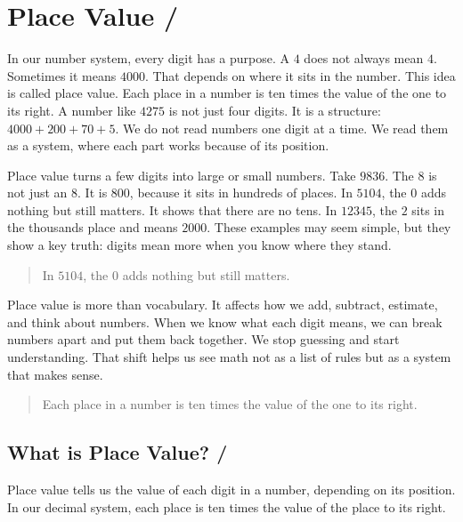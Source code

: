 
\section{Place Value / }

In our number system, every digit has a purpose. A \(4\) does not always mean \(4\).
Sometimes it means \(4000\). That depends on where it sits in the number. This idea
is called place value. Each place in a number is ten times the value of the one to
its right. A number like \(4275\) is not just four digits. It is a structure:
\(4000 + 200 + 70 + 5\). We do not read numbers one digit at a time. We read them
as a system, where each part works because of its position.

Place value turns a few digits into large or small numbers. Take \(9836\). The \(8\)
is not just an \(8\). It is \(800\), because it sits in hundreds of places. In
\(5104\), the \(0\) adds nothing but still matters. It shows that there are no
tens. In \(12345\), the \(2\) sits in the thousands place and means \(2000\). These
examples may seem simple, but they show a key truth: digits mean more when you know
where they stand.

\blockquote{In \(5104\), the \(0\) adds nothing but still matters.}


Place value is more than vocabulary. It affects how we add, subtract, estimate, and
think about numbers. When we know what each digit means, we can break numbers apart
and put them back together. We stop guessing and start understanding. That shift
helps us see math not as a list of rules but as a system that makes sense.

\blockquote{Each place in a number is ten times the value of the one to its right.}


\subsection{What is Place Value? / }

Place value tells us the value of each digit in a number, depending on its
position. In our decimal system, each place is ten times the value of the place to
its right.

